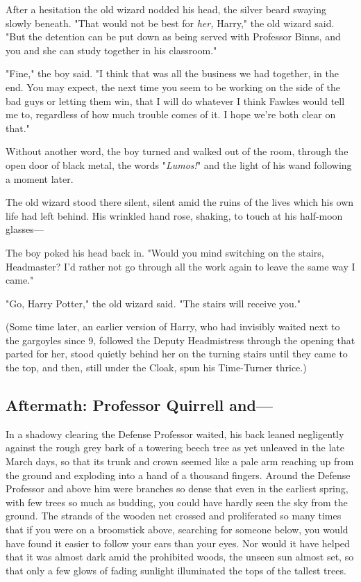 After a hesitation the old wizard nodded his head, the silver beard swaying
slowly beneath. "That would not be best for \emph{her,} Harry," the old wizard
said. "But the detention can be put down as being served with Professor Binns,
and you and she can study together in his classroom."

"Fine," the boy said. "I think that was all the business we had together, in
the end. You may expect, the next time you seem to be working on the side of
the bad guys or letting them win, that I will do whatever I think Fawkes would
tell me to, regardless of how much trouble comes of it. I hope we're both clear
on that."

Without another word, the boy turned and walked out of the room, through the
open door of black metal, the words "\emph{Lumos!}" and the light of his wand
following a moment later.

The old wizard stood there silent, silent amid the ruins of the lives which his
own life had left behind. His wrinkled hand rose, shaking, to touch at his
half-moon glasses—

The boy poked his head back in. "Would you mind switching on the stairs,
Headmaster? I'd rather not go through all the work again to leave the same way
I came."

"Go, Harry Potter," the old wizard said. "The stairs will receive you."

(Some time later, an earlier version of Harry, who had invisibly waited next to
the gargoyles since 9\PM, followed the Deputy Headmistress through the opening
that parted for her, stood quietly behind her on the turning stairs until they
came to the top, and then, still under the Cloak, spun his Time-Turner thrice.)
\sbreak
\vspace{-2\baselineskip}
\subsection{Aftermath: Professor Quirrell and—}

In a shadowy clearing the Defense Professor waited, his back leaned negligently
against the rough grey bark of a towering beech tree as yet unleaved in the
late March days, so that its trunk and crown seemed like a pale arm reaching up
from the ground and exploding into a hand of a thousand fingers. Around the
Defense Professor and above him were branches so dense that even in the
earliest spring, with few trees so much as budding, you could have hardly seen
the sky from the ground. The strands of the wooden net crossed and proliferated
so many times that if you were on a broomstick above, searching for someone
below, you would have found it easier to follow your ears than your eyes. Nor
would it have helped that it was almost dark amid the prohibited woods, the
unseen sun almost set, so that only a few glows of fading sunlight illuminated
the tops of the tallest trees.

